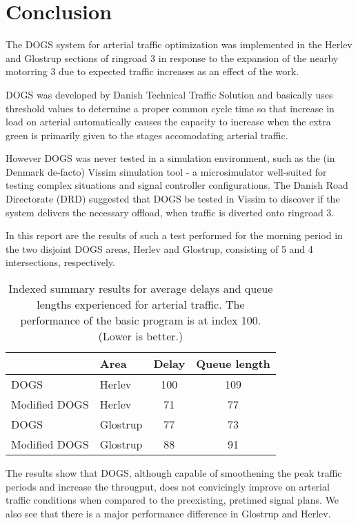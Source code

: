 \section{Conclusion}
\label{conclusion}

The DOGS system for arterial traffic optimization was implemented in the Herlev and Glostrup sections of ringroad 3 in response to the expansion of the nearby motorring 3 due to expected traffic increases as an effect of the work.

DOGS was developed by Danish Technical Traffic Solution and basically uses threshold values to determine a proper common cycle time so that increase in load on arterial automatically causes the capacity to increase when the extra green is primarily given to the stages accomodating arterial traffic.

However DOGS was never tested in a simulation environment, such as the (in Denmark de-facto) Vissim simulation tool - a microsimulator well-suited for testing complex situations and signal controller configurations.
The Danish Road Directorate (DRD) suggested that DOGS be tested in Vissim to discover if the system delivers the necessary offload, when traffic is diverted onto ringroad 3.

In this report are the results of such a test performed for the morning period in the two disjoint DOGS areas, Herlev and Glostrup, consisting of 5 and 4 intersections, respectively. 

\begin{table}[ht]
\centering
\begin{tabular}{l|l|c|c}
& \textbf{Area} & \textbf{Delay} & \textbf{Queue length} \\ \hline
DOGS & Herlev & 100 & 109 \\
Modified DOGS & Herlev & 71 & 77 \\
DOGS & Glostrup & 77 &  73 \\
Modified DOGS & Glostrup & 88 & 91
\end{tabular}
\caption{Indexed summary results for average delays and queue lengths experienced for arterial traffic. The performance of the basic program is at index 100. (Lower is better.)}
\label{tab:result_summary}
\end{table}

The results show that DOGS, although capable of smoothening the peak traffic periods and increase the througput, does not convicingly improve on arterial traffic conditions when compared to the preexisting, pretimed signal plans. We also see that there is a major performance difference in Glostrup and Herlev.

